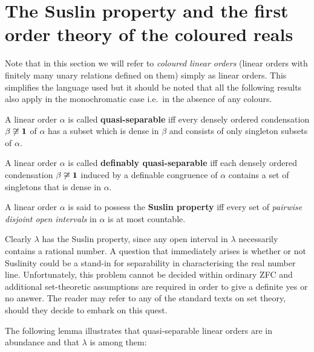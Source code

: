 \section{The Suslin property and the first order theory of the coloured reals}

Note that in this section we will refer to \textit{coloured linear orders}
(linear orders with finitely many unary relations defined on them) simply as
linear orders.  This simplifies the language used but it should be noted that
all the following results also apply in the monochromatic case i.e.\ in the
absence of any colours.

\begin{dfn}\label{dfn:quasiseparable}
	A linear order $\alpha$ is called \textbf{quasi-separable} iff every
	densely ordered condensation $\beta\not\cong\mathbf{1}$ of $\alpha$ has a subset
	which is dense in $\beta$ and consists of only singleton subsets of $\alpha$.
\end{dfn}

\begin{dfn}
	A linear order $\alpha$ is called \textbf{definably quasi-separable} iff
	each densely ordered condensation $\beta\not\cong\mathbf{1}$ induced by a definable
	congruence of $\alpha$ contains a set of singletons that is dense in $\alpha$.
\end{dfn}

\begin{dfn}
	A linear order $\alpha$ is said to possess the \textbf{Suslin property} iff
	every set of \textit{pairwise disjoint open intervals} in $\alpha$ is at most
	countable.
\end{dfn}

Clearly $\lambda$ has the Suslin property, since any open interval in $\lambda$
necessarily contains a rational number.  A question that immediately arises is
whether or not Suslinity could be a stand-in for separability in characterising
the real number line.  Unfortunately, this problem cannot be decided within
ordinary ZFC and additional set-theoretic assumptions are required in order to
give a definite yes or no answer.  The reader may refer to any of the standard
texts on set theory, should they decide to embark on this quest.

The following lemma illustrates that quasi-separable linear orders are in
abundance and that $\lambda$ is among them:

